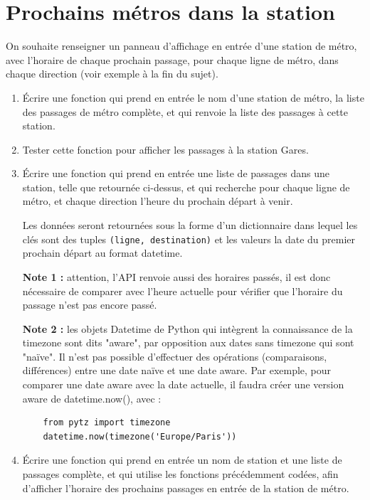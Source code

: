 \documentclass[11pt,a4paper]{article}
\begin{document}
\section{Prochains métros dans la station}


On souhaite renseigner un panneau d'affichage en entrée d'une station de métro, avec l'horaire de chaque prochain passage, pour chaque ligne de métro, dans chaque direction (voir exemple à la fin du sujet). 

\begin{enumerate}
    \item Écrire une fonction qui prend en entrée le nom d'une station de métro, la liste des passages de métro complète, et qui renvoie la liste des passages à cette station. 
    \item Tester cette fonction pour afficher les passages à la station Gares.
    
    \item Écrire une fonction qui prend en entrée une liste de passages dans une station, telle que retournée ci-dessus, et qui recherche pour chaque ligne de métro, et chaque direction l'heure du prochain départ à venir. 
    
    Les données seront retournées sous la forme d'un dictionnaire dans lequel les clés sont des tuples \verb+(ligne, destination)+ et les valeurs la date du premier prochain départ au format datetime. 

    \textbf{Note 1 :} attention, l'API renvoie aussi des horaires passés, il est donc nécessaire de comparer avec l'heure actuelle pour vérifier que l'horaire du passage n'est pas encore passé.

    \textbf{Note 2 :} les objets Datetime de Python qui intègrent la connaissance de la timezone sont dits "aware", par opposition aux dates sans timezone qui sont "naïve". Il n'est pas possible d'effectuer des opérations (comparaisons, différences) entre une date naïve et une date aware. Par exemple, pour comparer une date aware avec la date actuelle, il faudra créer une version aware de datetime.now(), avec : 
\begin{verbatim}
    from pytz import timezone
    datetime.now(timezone('Europe/Paris'))
\end{verbatim}

    \item Écrire une fonction qui prend en entrée un nom de station et une liste de passages complète, et qui utilise les fonctions précédemment codées, afin d'afficher l'horaire des prochains passages en entrée de la station de métro. 
    

\end{enumerate}
\end{document}
